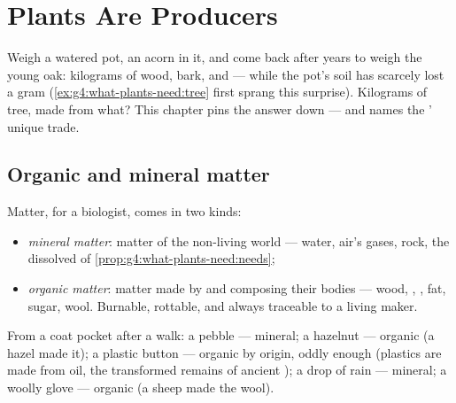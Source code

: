\chapter{Plants Are Producers}\label{ch:g6:plants-are-producers}

Weigh a watered pot,  an acorn in it, and come back
after years to weigh the young oak: kilograms of wood, bark,
 and  --- while the pot's soil has scarcely lost a
gram (\cref{ex:g4:what-plants-need:tree} first sprang this
surprise). Kilograms of tree, made from what? This chapter
pins the answer down --- and names the ' unique trade.

\section{Organic and mineral matter}

\begin{definition}\label{def:g6:plants-are-producers:matter}
Matter, for a biologist, comes in two kinds:
\begin{itemize}
  \item \emph{mineral matter}: matter
        of the non-living world --- water, air's gases,
        rock, the dissolved  of
        \cref{prop:g4:what-plants-need:needs};
  \item \emph{organic matter}: matter
        made by  and composing their bodies ---
        wood, , , fat, sugar, wool. Burnable,
        rottable, and always traceable to a living maker.
\end{itemize}
\end{definition}

\begin{example}\label{ex:g6:plants-are-producers:sorting}
From a coat pocket after a walk: a pebble --- mineral; a
hazelnut --- organic (a hazel made it); a plastic button ---
organic by origin, oddly enough (plastics are made from oil,
the transformed remains of ancient ); a drop of
rain --- mineral; a woolly glove --- organic (a sheep made
the wool).
\end{example}

